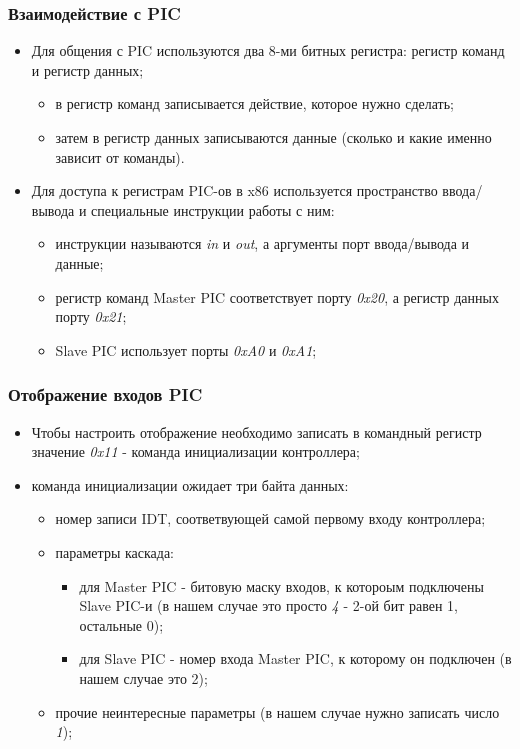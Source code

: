 \begin{frame}
\frametitle{Взаимодействие с PIC}
\begin{itemize}
  \item Для общения с PIC используются два 8-ми битных регистра: регистр команд
  и регистр данных;
  \begin{itemize}
    \item в регистр команд записывается действие, которое нужно сделать;
    \item затем в регистр данных записываются данные (сколько и какие именно
    зависит от команды).
  \end{itemize}
  \item Для доступа к регистрам PIC-ов в x86 используется пространство
  ввода/вывода и специальные инструкции работы с ним:
  \begin{itemize}
    \item инструкции называются \emph{in} и \emph{out}, а аргументы порт
    ввода/вывода и данные;
    \item регистр команд Master PIC соответствует порту \emph{0x20}, а регистр
    данных порту \emph{0x21};
    \item Slave PIC использует порты \emph{0xA0} и \emph{0xA1};
  \end{itemize}
\end{itemize}
\end{frame}

\begin{frame}
\frametitle{Отображение входов PIC}
\begin{itemize}
  \item Чтобы настроить отображение необходимо записать в командный регистр
  значение \emph{0x11} - команда инициализации контроллера;
  \item команда инициализации ожидает три байта данных:
  \begin{itemize}
    \item номер записи IDT, соответвующей самой первому входу контроллера;
    \item параметры каскада:
    \begin{itemize}
      \item для Master PIC - битовую маску входов, к котороым подключены Slave
      PIC-и (в нашем случае это просто \emph{4} - 2-ой бит равен 1, остальные
      0);
      \item для Slave PIC - номер входа Master PIC, к которому он подключен (в
      нашем случае это 2);
    \end{itemize}
    \item прочие неинтересные параметры (в нашем случае нужно записать число
    \emph{1});
  \end{itemize}
\end{itemize}
\end{frame}

